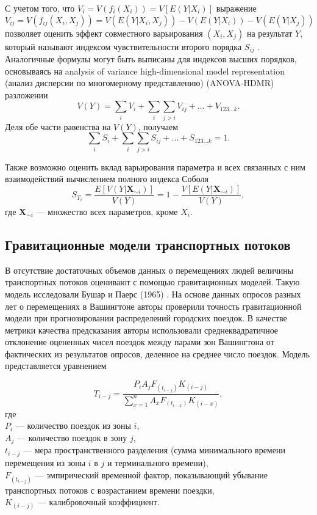 \documentclass[a4paper,12pt]{article} %
\begin{document}
С учетом того, что $V_i=V(f_i(X_i))=V[E(Y|X_i)]$ выражение
\begin{displaymath}
V_{ij}=V(f_{ij}(X_i,X_j))=V(E(Y|X_i,X_j))-V(E(Y|X_i))-V(E(Y|X_j))
\end{displaymath}
позволяет оценить эффект совместного варьирования $(X_i,X_j)$ на результат $Y$, который называют индексом чувствительности второго порядка $S_{ij}$ \cite{box1978statistics}. Аналогичные формулы могут быть выписаны для индексов высших порядков, основываясь на analysis of variance high-dimensional model representation (анализ дисперсии по многомерному представлению) (ANOVA-HDMR) разложении
\begin{displaymath}
V(Y)=\sum\limits_i V_i + \sum\limits_i \sum\limits_{j>i} V_{ij}+\ldots +V_{123\ldots k}.
\end{displaymath}
Деля обе части равенства на $V(Y)$, получаем
\begin{displaymath}
\sum\limits_i S_i + \sum\limits_i \sum\limits_{j>i} S_{ij}+\ldots +S_{123\ldots k}=1.
\end{displaymath}

Также возможно оценить вклад варьирования параметра и всех связанных с ним взаимодействий вычислением полного индекса Соболя
\begin{displaymath}
S_{T_i}=\frac{E[V(Y|\bm{X}_{\sim i})]}{V(Y)}=1-\frac{V[E(Y|\bm{X}_{\sim i})]}{V(Y)},
\end{displaymath}
где $\bm{X}_{\sim i}$ --- множество всех параметров, кроме $X_i$.
\subsection{Гравитационные модели транспортных потоков}
В отсутствие достаточных объемов данных о перемещениях людей величины транспортных потоков оценивают с помощью гравитационных моделей. Такую модель исследовали Бушар и Паерс (1965) \cite{bouchard1965use}. На основе данных опросов разных лет о перемещениях в Вашингтоне авторы проверили точность гравитационной модели при прогнозировании распределений городских поездок. В качестве метрики качества предсказания авторы использовали среднеквадратичное отклонение оцененных чисел поездок между парами зон Вашингтона от фактических из результатов опросов, деленное на среднее число поездок. Модель представляется уравнением

\begin{displaymath}
T_{i-j}=\frac{P_iA_jF_{(t_{i-j})}K_{(i-j)}}{\sum\limits_{x=1}^nA_xF_{(t_{i-x})}K_{(i-x)}},
\end{displaymath}
где \\ $P_i$ --- количество поездок из зоны $i$, \\ $A_j$ --- количество поездок в зону $j$, \\ $t_{i-j}$ --- мера пространственного разделения (сумма минимального времени перемещения из зоны $i$ в $j$ и терминального времени), \\ $F_{(t_{i-j})}$ --- эмпирический временной фактор, показывающий убывание транспортных потоков с возрастанием времени поездки, \\ $K_{(i-j)}$ --- калибровочный коэффициент.
\end{document}

